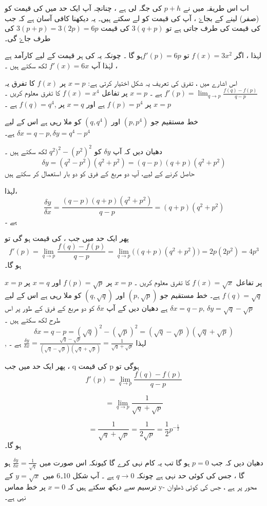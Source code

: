اب اس طریقہ میں نے \( p+h  \) کی جگہ لی ہے ،  چنانچہ آپ ایک حد میں  کی قیمت کو  (صفر) لینے کے بجاۓ ، آپ   کی قیمت کو  لے سکتے ہیں۔ 
یہ دیکھنا کافی آسان ہے کہ جب   کی قیمت کی طرف جاتی ہے تو  
\(3(q+p)\) کی قیمت \(3(p+p)=3(2p)=6p\)
 کی طرف جاۓ گی۔


لہذا ، اگر \( f(x)=3x^2  \) تو  \(f'(p)=6p\)ہو گا ۔  چونکہ یہ کی ہر قیمت کے لیے کارآمد ہے ، لہٰذا آپ \(f'(x)=6x\) لکھ سکتے ہیں ۔ 

اس اشارے میں ، تفرق کی تعریف یہ شکل اختیار کرتی ہے:
\(x=p\) پر \(f(x)\) کا تفرق یہ \(f'(p)=\lim_{q \to p}\frac{f(q)-f(p)}{q-p}\) ہے ۔ 
 \(x=p\) پر تفاعل \(f(x)=x^4\) کا تفرق معلوم کریں ۔ 
\(x=p\) پر \(f(p)=p^4\) ہے اور \(x=q\) پر ,\(f(q)=q^4\) ہے ۔ 
  
خط مستقیم جو \((p,p^4)\) اور \((q,q^4)\) کو ملا رہی ہے اس کے لیے \(\delta x=q-p, \delta y= q^4-p^4\) ہے۔ 


دھیان دیں کہ آپ \(\delta y\) کو \(q^2)^2 -(p^2)^2 \) لکھ سکتے ہیں ۔  \[\delta y= (q^2 -p^2)(q^2+p^2)=(q-p)(q+p)(q^2+p^2)\] حاصل کرنے کے لیے،  آپ  دو مربع کے فرق کو دو بار استعمال کر سکتے ہیں  

لہذا، \[\frac{\delta y}{\delta x}=\frac{(q-p)(q+p)(q^2+p^2)}{q-p}=(q+p)(q^2 +p^2)\] ہے ۔

پھر ایک حد میں جب ،  کی قیمت  ہو  گی تو \[f'(p)=\lim_{q \to p}\frac{f(q)-f(p)}{q-p}=\lim_{q \to p}\big((q+p)(q^2 +p^2)\big)=2p(2p^2)=4p^3\] ہو گا۔ 


\(x=p\) پر تفاعل \(f(x)=\sqrt{x}\) کا تفرق معلوم کریں ۔
\(x=p\) پر \(f(p)=\sqrt{p}\) اور \(x=q\) پر \(f(q)=\sqrt{q}\)   ہے۔
خط مستقیم جو \((p,\sqrt{p})\) اور \((q,\sqrt{q})\)  کو ملا رہی ہے  اس کے لیے   \(\delta x=q-p, \, \delta y=\sqrt{q}-\sqrt{p}\) ہے  
دھیان دیں کے آپ \(\delta x\) کو  دو مربع کے فرق کے طور پر اس طرح لکھ سکتے ہیں ۔ \[\delta x=q-p=(\sqrt{q})^2-(\sqrt{p})^2 = (\sqrt{q} - \sqrt{p})(\sqrt{q} + \sqrt{p})\]
,%
لہذا \(\frac{\delta y}{\delta x}= \frac{\sqrt{q}-\sqrt{p}}{(\sqrt{q}-\sqrt{p})(\sqrt{q}+\sqrt{p})}=\frac{1}{\sqrt{q}+\sqrt{p}}\) ہے ۔

پھر ایک حد میں جب ، q کی قیمت p ہوگی تو \[f'(p)=\lim_{q \to p}\frac{f(q)-f(p)}{q-p}\] 

\[=\lim_{q \to p}\frac{1}{\sqrt{q}+\sqrt{p}}\]


\[=\frac{1}{\sqrt{q}+\sqrt{p}}=\frac{1}{2\sqrt{p}}=\frac{1}{2}p^{-\frac{1}{2}}\] ہو گا۔

دھیان دیں کہ جب \(p=0\) ہو گا تب یہ کام نہی کرے گا  کیونکہ اس صورت میں \(\frac{\delta y}{\delta x}=\frac{1}{\sqrt{q}}\)  ہو گا ، جس کی کوئی حد نہی ہے چونکہ \(q \to 0\) ہے ۔ آپ شکل 10۔6 میں \(y=\sqrt{x}\) کے ترسیم سے دیکھ سکتے ہیں کہ \(x=0\) پر خط مماس y- محور پر ہے ، جس کی کوئی ڈھلوان نہی ہے۔ 


